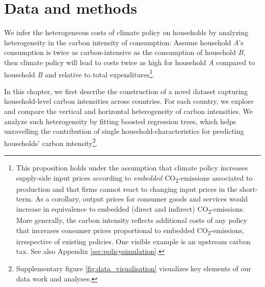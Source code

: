 \documentclass[12pt, a4paper]{article}
\begin{document}

\section{Data and methods} \label{sec:data_methods}

We infer the heterogeneous costs of climate policy on households by analyzing heterogeneity in the carbon intensity of consumption: Assume household \textit{A}'s consumption is twice as carbon-intensive as the consumption of household \textit{B}, then climate policy will lead to costs twice as high for household \textit{A} compared to household \textit{B} and relative to total expenditures\footnote{This proposition holds under the assumption that climate policy increases supply-side input prices according to \textit{embedded} CO\textsubscript{2}-emissions associated to production and that firms cannot react to changing input prices in the short-term. As a corollary, output prices for consumer goods and services would increase in equivalence to embedded (direct and indirect) CO\textsubscript{2}-emissions. More generally, the carbon intensity reflects additional costs of any policy that increases consumer prices proportional to embedded CO\textsubscript{2}-emissions, irrespective of existing policies. One visible example is an upstream carbon tax. See also Appendix \ref{sec:policysimulation}.}.

In this chapter, we first describe the construction of a novel dataset capturing household-level carbon intensities across countries. For each country, we explore and compare the vertical and horizontal heterogeneity of carbon intensities. We analyze such heterogeneity by fitting boosted regression trees, which helps unravelling the contribution of single household-characteristics for predicting households' carbon intensity\footnote{Supplementary figure \ref{fig:data_visualisation} visualizes key elements of our data work and analyses.}.
\end{document}
